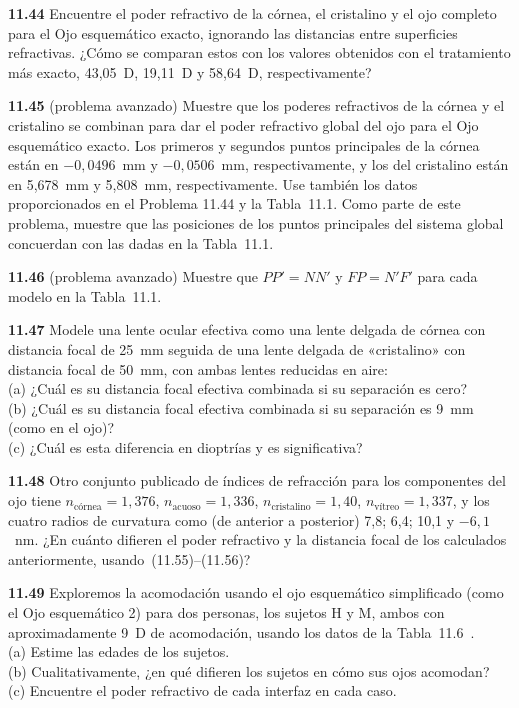 \documentclass[12pt]{book}
\begin{document}
\textbf{11.44} Encuentre el poder refractivo de la córnea, el cristalino y el ojo completo para el Ojo esquemático exacto, ignorando las distancias entre superficies refractivas. ¿Cómo se comparan estos con los valores obtenidos con el tratamiento más exacto, 43,05~D, 19,11~D y 58,64~D, respectivamente?

\textbf{11.45} (problema avanzado) Muestre que los poderes refractivos de la córnea y el cristalino se combinan para dar el poder refractivo global del ojo para el Ojo esquemático exacto. Los primeros y segundos puntos principales de la córnea están en $-0{,}0496$~mm y $-0{,}0506$~mm, respectivamente, y los del cristalino están en 5,678~mm y 5,808~mm, respectivamente. Use también los datos proporcionados en el Problema 11.44 y la Tabla~11.1. Como parte de este problema, muestre que las posiciones de los puntos principales del sistema global concuerdan con las dadas en la Tabla~11.1.

\textbf{11.46} (problema avanzado) Muestre que $PP' = NN'$ y $FP = N'F'$ para cada modelo en la Tabla~11.1.

\textbf{11.47} Modele una lente ocular efectiva como una lente delgada de córnea con distancia focal de 25~mm seguida de una lente delgada de «cristalino» con distancia focal de 50~mm, con ambas lentes reducidas en aire:\\
(a) ¿Cuál es su distancia focal efectiva combinada si su separación es cero?\\
(b) ¿Cuál es su distancia focal efectiva combinada si su separación es 9~mm (como en el ojo)?\\
(c) ¿Cuál es esta diferencia en dioptrías y es significativa?

\textbf{11.48} Otro conjunto publicado de índices de refracción para los componentes del ojo tiene $n_\text{córnea} = 1{,}376$, $n_\text{acuoso} = 1{,}336$, $n_\text{cristalino} = 1{,}40$, $n_\text{vítreo} = 1{,}337$, y los cuatro radios de curvatura como (de anterior a posterior) 7,8; 6,4; 10,1 y $-6{,}1$~nm. ¿En cuánto difieren el poder refractivo y la distancia focal de los calculados anteriormente, usando~(11.55)--(11.56)?

\textbf{11.49} Exploremos la acomodación usando el ojo esquemático simplificado (como el Ojo esquemático 2) para dos personas, los sujetos H y M, ambos con aproximadamente 9~D de acomodación, usando los datos de la Tabla~11.6~\cite{28}.\\
(a) Estime las edades de los sujetos.\\
(b) Cualitativamente, ¿en qué difieren los sujetos en cómo sus ojos acomodan?\\
(c) Encuentre el poder refractivo de cada interfaz en cada caso.
\end{document}
